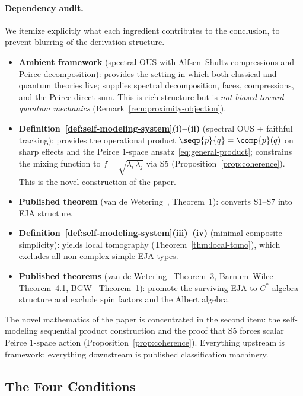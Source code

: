 \paragraph{Dependency audit.}
We itemize explicitly what each ingredient contributes to the
conclusion, to prevent blurring of the derivation structure.
\begin{itemize}[nosep]
\item \textbf{Ambient framework}
  (spectral OUS with Alfsen--Shultz compressions and Peirce
  decomposition): provides the setting in which both classical and
  quantum theories live; supplies spectral decomposition, faces,
  compressions, and the Peirce direct sum.  This is rich structure
  but is \emph{not biased toward quantum mechanics}
  (Remark~\ref{rem:proximity-objection}).
\item \textbf{Definition~\ref{def:self-modeling-system}(i)--(ii)}
  (spectral OUS + faithful tracking):
  provides the operational product $\seqp{p}{q} = \comp{p}(q)$ on
  sharp effects and the Peirce $1$-space
  ansatz~\eqref{eq:general-product}; constrains the mixing function
  to $f = \sqrt{\lambda_i\, \lambda_j}$ via S5
  (Proposition~\ref{prop:coherence}).
  This is the novel construction of the paper.
\item \textbf{Published theorem}
  (van de Wetering~\cite{vandeWetering2019b}, Theorem~1):
  converts S1--S7 into EJA structure.
\item \textbf{Definition~\ref{def:self-modeling-system}(iii)--(iv)}
  (minimal composite + simplicity):
  yields local tomography (Theorem~\ref{thm:local-tomo}), which
  excludes all non-complex simple EJA types.
\item \textbf{Published theorems}
  (van de Wetering~\cite{vandeWetering2019b} Theorem~3,
  Barnum--Wilce~\cite{BarnumWilce2014} Theorem~4.1,
  BGW~\cite{BarnumUdudeckVdW2020} Theorem~1):
  promote the surviving EJA to $C^{*}$-algebra structure and
  exclude spin factors and the Albert algebra.
\end{itemize}
\noindent
The novel mathematics of the paper is concentrated in the second
item: the self-modeling sequential product construction and the proof
that S5 forces scalar Peirce $1$-space action
(Proposition~\ref{prop:coherence}).  Everything upstream is framework;
everything downstream is published classification machinery.


\subsection{The Four Conditions}\label{subsec:assumptions}

